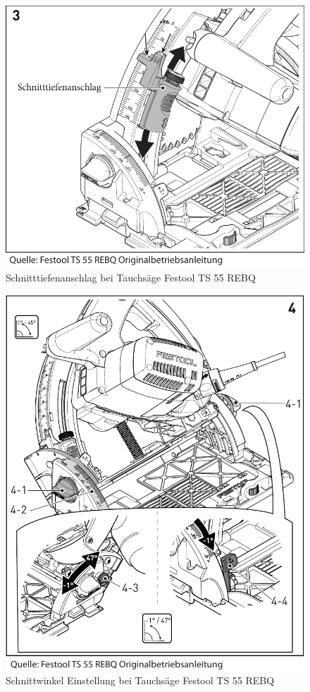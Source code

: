 \documentclass{\basedir/fablab-document}
\begin{document}
\begin{figure}[h]
	\centering
	\includegraphics[width=1\textwidth]{img/festool-schnitttiefenanschlag.pdf}
	\caption{Schnitttiefenanschlag bei Tauchsäge Festool TS 55 REBQ}
	\label{fig:schnitttiefenanschlag}
\end{figure}

\begin{figure}[h]
	\centering
	\includegraphics[width=1\textwidth]{img/festool-schnittwinkel.pdf}
	\caption{Schnittwinkel Einstellung bei Tauchsäge Festool TS 55 REBQ}
	\label{fig:schnittwinkel}
\end{figure}
\end{document}
